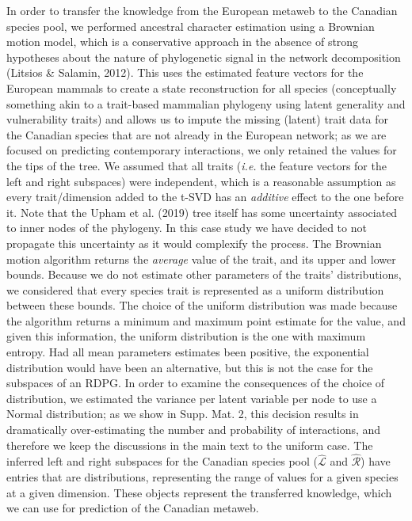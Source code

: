 \documentclass[11pt]{article}
\begin{document}
In order to transfer the knowledge from the European metaweb to the
Canadian species pool, we performed ancestral character estimation using
a Brownian motion model, which is a conservative approach in the absence
of strong hypotheses about the nature of phylogenetic signal in the
network decomposition (Litsios \& Salamin, 2012). This uses the
estimated feature vectors for the European mammals to create a state
reconstruction for all species (conceptually something akin to a
trait-based mammalian phylogeny using latent generality and
vulnerability traits) and allows us to impute the missing (latent) trait
data for the Canadian species that are not already in the European
network; as we are focused on predicting contemporary interactions, we
only retained the values for the tips of the tree. We assumed that all
traits (\emph{i.e.} the feature vectors for the left and right
subspaces) were independent, which is a reasonable assumption as every
trait/dimension added to the t-SVD has an \emph{additive} effect to the
one before it. Note that the Upham et al. (2019) tree itself has some
uncertainty associated to inner nodes of the phylogeny. In this case
study we have decided to not propagate this uncertainty as it would
complexify the process. The Brownian motion algorithm returns the
\emph{average} value of the trait, and its upper and lower bounds.
Because we do not estimate other parameters of the traits'
distributions, we considered that every species trait is represented as
a uniform distribution between these bounds. The choice of the uniform
distribution was made because the algorithm returns a minimum and
maximum point estimate for the value, and given this information, the
uniform distribution is the one with maximum entropy. Had all mean
parameters estimates been positive, the exponential distribution would
have been an alternative, but this is not the case for the subspaces of
an RDPG. In order to examine the consequences of the choice of
distribution, we estimated the variance per latent variable per node to
use a Normal distribution; as we show in Supp. Mat. 2, this decision
results in dramatically over-estimating the number and probability of
interactions, and therefore we keep the discussions in the main text to
the uniform case. The inferred left and right subspaces for the Canadian
species pool (\(\hat{\mathscr{L}}\) and \(\hat{\mathscr{R}}\)) have
entries that are distributions, representing the range of values for a
given species at a given dimension. These objects represent the
transferred knowledge, which we can use for prediction of the Canadian
metaweb.
\end{document}
